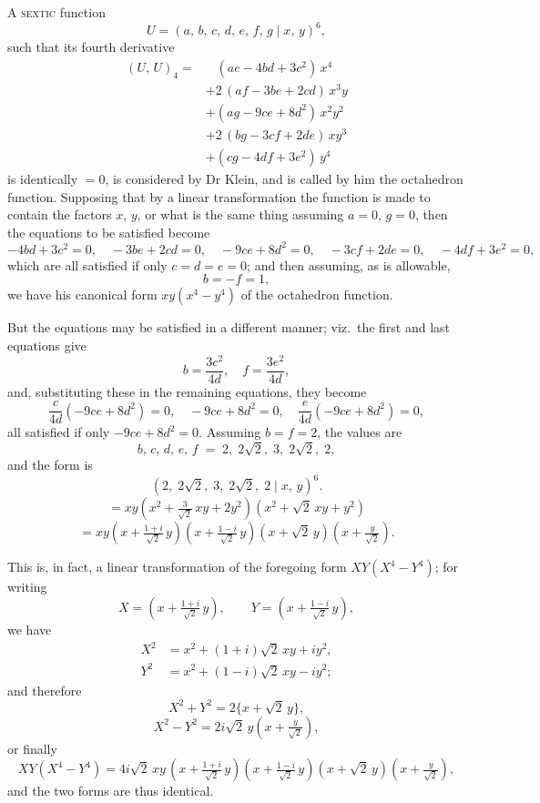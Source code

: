 \documentclass[11pt]{article}
\begin{document}
\bigskip

A \textsc{sextic} function
\[
   U = (a,\, b,\, c,\, d,\, e,\, f,\, g \mid x,\, y)^6,
\]
such that its fourth derivative
\begin{align*}
   (U,\, U)_4 ={}& \;\;\;(ae - 4bd + 3c^2)\,x^4\\
                & + 2\,(af - 3be + 2cd)\,x^3 y\\
                & + (ag - 9ce + 8d^2)\,x^2 y^2\\
                & + 2\,(bg - 3cf + 2de)\,x y^3\\
                & + (cg - 4df + 3e^2)\,y^4
\end{align*}
is identically $= 0$, is considered by Dr Klein, and is called by him the octahedron
function. Supposing that by a linear transformation the function is made to contain
the factors $x$, $y$, or what is the same thing assuming $a = 0$, $g = 0$, then the equations
to be satisfied become
\[
   -4bd + 3c^2 = 0,\quad -3be + 2cd = 0,\quad -9ce + 8d^2 = 0,\quad -3cf + 2de = 0,\quad -4df + 3e^2 = 0,
\]
which are all satisfied if only $c = d = e = 0$; and then assuming, as is allowable,
\[
   b = -f = 1,
\]
we have his canonical form $xy(x^4 - y^4)$ of the octahedron function.

But the equations may be satisfied in a different manner; viz.\ the first and last
equations give
\[
   b = \frac{3c^2}{4d},\quad f = \frac{3e^2}{4d},
\]
and, substituting these in the remaining equations, they become
\[
   \frac{c}{4d}(-9ce + 8d^2) = 0,\quad -9ce + 8d^2 = 0,\quad \frac{e}{4d}(-9ce + 8d^2) = 0,
\]
all satisfied if only $-9ce + 8d^2 = 0$. Assuming $b = f = 2$, the values are
\[
   b,\, c,\, d,\, e,\, f \;=\; 2,\; 2\sqrt{2},\; 3,\; 2\sqrt{2},\; 2,
\]
and the form is
\[
   \left(2,\; 2\sqrt{2},\; 3,\; 2\sqrt{2},\; 2 \mid x,\, y\right)^6.
\]
\[
   = xy\left(x^2 + \tfrac{3}{\sqrt{2}}\,xy + 2y^2\right)\left(x^2 + \sqrt{2}\,xy + y^2\right)
\]
\[
   = xy\left(x + \tfrac{1+i}{\sqrt{2}}\,y\right)\!\left(x + \tfrac{1-i}{\sqrt{2}}\,y\right)\!\left(x + \sqrt{2}\,y\right)\!\left(x + \tfrac{y}{\sqrt{2}}\right)\!.
\]

This is, in fact, a linear transformation of the foregoing form $XY(X^4 - Y^4)$; for
writing
\[
   X = \left(x + \tfrac{1+i}{\sqrt{2}}\,y\right),\qquad Y = \left(x + \tfrac{1-i}{\sqrt{2}}\,y\right),
\]
we have
\begin{align*}
   X^2 &= x^2 + (1+i)\sqrt{2}\,xy + iy^2,\\
   Y^2 &= x^2 + (1-i)\sqrt{2}\,xy - iy^2;
\end{align*}
and therefore
\[
   X^2 + Y^2 = 2\bigl\{x + \sqrt{2}\,y\bigr\},
\]
\[
   X^2 - Y^2 = 2i\sqrt{2}\,y\left(x + \tfrac{y}{\sqrt{2}}\right),
\]
or finally
\[
   XY(X^4 - Y^4) = 4i\sqrt{2}\,xy\,\left(x + \tfrac{1+i}{\sqrt{2}}\,y\right)\!\left(x + \tfrac{1-i}{\sqrt{2}}\,y\right)\!\left(x + \sqrt{2}\,y\right)\!\left(x + \tfrac{y}{\sqrt{2}}\right)\!,
\]
and the two forms are thus identical.
\end{document}
